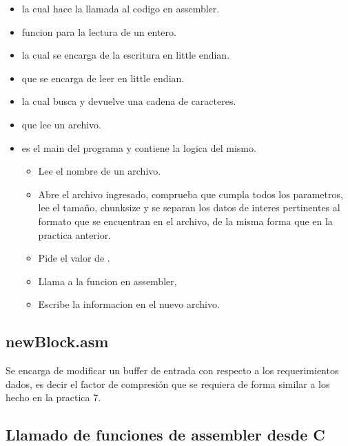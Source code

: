\begin{itemize}
    \item \textbf{} la cual hace la llamada al codigo en assembler.
    \item  \textbf{} funcion para la lectura de un entero.
    \item \textbf{} la cual se encarga de la escritura
        en little endian.
    \item \textbf{}  que se encarga de leer en little
        endian.
    \item \textbf{} la cual busca y devuelve una cadena de
        caracteres.
    \item \textbf{} que lee un archivo.
    \item \textbf{} es el main del programa y contiene la logica
        del mismo.

        \begin{itemize}
            \item Lee el nombre de un archivo.
            \item Abre el archivo ingresado, comprueba que cumpla todos los
                parametros, lee el tamaño, chunksize y se separan los datos de
                interes pertinentes al formato que se encuentran en el archivo,
                de la misma forma que en la practica anterior.
            \item Pide el valor de .
            \item Llama a la funcion en assembler,
            \item Escribe la informacion en el nuevo archivo.
        \end{itemize}
\end{itemize}

\subsection*{newBlock.asm}\label{asm}

Se encarga de modificar un buffer de entrada con respecto a los requerimientos
dados, es decir el factor  de compresión que se requiera de forma
similar a los hecho en la practica 7.


\subsection*{Llamado de funciones de assembler desde C}

